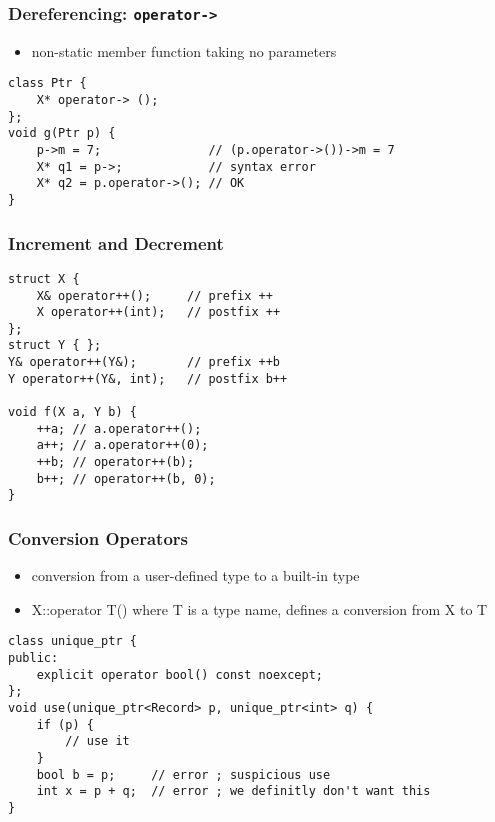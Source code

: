 \documentclass{beamer}
\begin{document}
\begin{frame}[fragile]
\frametitle{Dereferencing: \texttt{operator->} }
\begin{itemize}
\item non-static member function taking no parameters
\end{itemize}
\begin{example}
\begin{lstlisting}
class Ptr {
    X* operator-> ();
};
void g(Ptr p) {
    p->m = 7;               // (p.operator->())->m = 7
    X* q1 = p->;            // syntax error
    X* q2 = p.operator->(); // OK
}
\end{lstlisting}
\end{example}
\end{frame}



\begin{frame}[fragile]
\frametitle{Increment and Decrement }

\begin{example}
\begin{lstlisting}
struct X {
    X& operator++();     // prefix ++
    X operator++(int);   // postfix ++
};
struct Y { };
Y& operator++(Y&);       // prefix ++b 
Y operator++(Y&, int);   // postfix b++

void f(X a, Y b) {
    ++a; // a.operator++();
    a++; // a.operator++(0);
    ++b; // operator++(b);
    b++; // operator++(b, 0);
}

\end{lstlisting}
\end{example}
\end{frame}

\begin{frame}[fragile]
\frametitle{Conversion Operators}
\begin{itemize}
\item conversion from a user-defined type to a built-in type
\item X::operator T()  where T is a type name, defines a conversion from X to T
\end{itemize}
\begin{example}
\begin{lstlisting}
class unique_ptr {
public:
    explicit operator bool() const noexcept;
};
void use(unique_ptr<Record> p, unique_ptr<int> q) {
    if (p) {
        // use it
    }
    bool b = p;     // error ; suspicious use
    int x = p + q;  // error ; we definitly don't want this
}
\end{lstlisting}
\end{example}

\end{frame}
\end{document}
